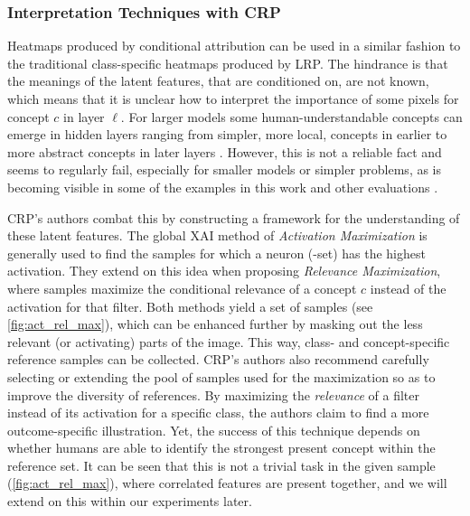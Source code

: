 \subsubsection{Interpretation Techniques with CRP}
Heatmaps produced by conditional attribution can be used in a similar fashion to the traditional class-specific heatmaps produced by LRP. The hindrance is that the meanings of the latent features, that are conditioned on, are not known, which means that it is unclear how to interpret the importance of some pixels for concept $c$ in layer $\ell$. For larger models some human-understandable concepts can emerge in hidden layers ranging from simpler, more local, concepts in earlier to more abstract concepts in later layers \citep{Bau2017, Hohman2020, Olah2017, Bau2020}. However, this is not a reliable fact and seems to regularly fail, especially for smaller models or simpler problems, as is becoming visible in some of the examples in this work and other evaluations \citep{Traeuble2021,Kim2018,Singla2022, Sixt2022a}.

CRP's authors combat this by constructing a framework for the understanding of these latent features. The global XAI method of \textit{Activation Maximization} \citep{Nguyen2016} is generally used to find the samples for which a neuron (-set) has the highest activation. They extend on this idea when proposing \textit{Relevance Maximization}, where samples maximize the conditional relevance of a concept $c$ instead of the activation for that filter. Both methods yield a set of samples (see \cref{fig:act_rel_max}), which can be enhanced further by masking out the less relevant (or activating) parts of the image. This way, class- and concept-specific reference samples can be collected. CRP's authors also recommend carefully selecting or extending the pool of samples used for the maximization so as to improve the diversity of references. By maximizing the \textit{relevance} of a filter instead of its activation for a specific class, the authors claim to find a more outcome-specific illustration. Yet, the success of this technique depends on whether humans are able to identify the strongest present concept within the reference set. It can be seen that this is not a trivial task in the given sample (\cref{fig:act_rel_max}), where correlated features are present together, and we will extend on this within our experiments later. 

